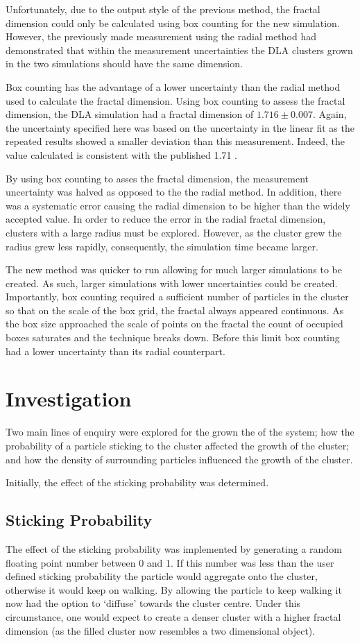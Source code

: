 \documentclass[%
 aapm,
 mph,%
 amsmath,amssymb,
 reprint,%
]{revtex4-2}
\begin{document}
Unfortunately, due to the output style of the previous method, the fractal dimension could only be calculated using box counting for the new simulation. However, the previously made measurement using the radial method had demonstrated that within the measurement uncertainties the DLA clusters grown in the two simulations should have the same dimension.

Box counting has the advantage of a lower uncertainty than the radial method used to calculate the fractal dimension. Using box counting to assess the fractal dimension, the DLA simulation had a fractal dimension of $1.716 \pm 0.007$. Again, the uncertainty specified here was based on the uncertainty in the linear fit as the repeated results showed a smaller deviation than this measurement. Indeed, the value calculated is consistent with the published 1.71 \cite{FractalsBook,MeakinDLA}.

By using box counting to asses the fractal dimension, the measurement uncertainty was halved as opposed to the the radial method. In addition, there was a systematic error causing the radial dimension to be higher than the widely accepted value. In order to reduce the error in the radial fractal dimension, clusters with a large radius must be explored. However, as the cluster grew the radius grew less rapidly, consequently, the simulation time became larger.

The new method was quicker to run allowing for much larger simulations to be created. As such, larger simulations with lower uncertainties could be created. Importantly, box counting required a sufficient number of particles in the cluster so that on the scale of the box grid, the fractal always appeared continuous. As the box size approached the scale of points on the fractal the count of occupied boxes saturates and the technique breaks down. Before this limit box counting had a lower uncertainty than its radial counterpart.
\section{Investigation}
Two main lines of enquiry were explored for the grown the of the system; how the probability of a particle sticking to the cluster affected the growth of the cluster; and how the density of surrounding particles influenced the growth of the cluster.

Initially, the effect of the sticking probability was determined.
\subsection{Sticking Probability}
The effect of the sticking probability was implemented by generating a random floating point number between 0 and 1. If this number was less than the user defined sticking probability the particle would aggregate onto the cluster, otherwise it would keep on walking. By allowing the particle to keep walking it now had the option to `diffuse' towards the cluster centre. Under this circumstance, one would expect to create a denser cluster with a higher fractal dimension (as the filled cluster now resembles a two dimensional object).
\end{document}
